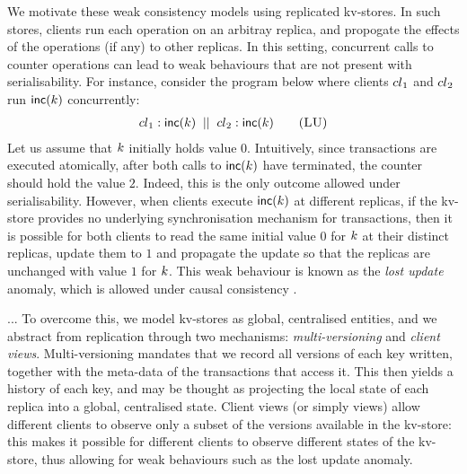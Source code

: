 We motivate these weak consistency models using replicated kv-stores. In
such stores, clients run each operation on an arbitray replica, and
propogate the effects of the operations (if any) to other
replicas. In this setting, concurrent calls to counter
operations can lead to weak behaviours that are not present with
serialisability.
%
%
For instance, consider the program below where  clients ${cl}_1$ and 
${cl}_2$  run $\mathsf{inc}(k)$ concurrently: 
\begin{align}
	\cl_1: \ctrinc(\ke)
	\;\; || \;\;
	\cl_2: \ctrinc(\ke)
	\tag{\textsc{LU}}
	\label{prog:inc2}
\end{align}
Let us assume that  $k$ initially holds value $0$.
Intuitively, since transactions are executed atomically, after both
calls to $\mathsf{inc}(k)$ have terminated, the counter should hold 
the value $2$.
Indeed, this is the only outcome allowed under serialisability. 
However, when clients execute $\mathsf{inc}(k)$ at different replicas,
if the kv-store provides no underlying synchronisation mechanism for transactions,
 then it is possible for 
both clients to  read the same initial value $0$ for $k$ at their
distinct replicas, update them to $1$ and propagate the update so that 
 the replicas are unchanged with value  $1$ for $k$.
This weak behaviour is known as the \emph{lost update} anomaly, which
is  allowed under causal consistency \cite{cops,wren,redblue}.


...
To overcome this, we model kv-stores as global, centralised entities, and 
we abstract from replication through two mechanisms: \emph{multi-versioning} and \emph{client views}. 
Multi-versioning mandates that we record all versions of each key written, 
together with the meta-data of the transactions that access it. 
This then yields a history of each key, and may be thought as projecting the local state of each replica into a global, centralised state. 
Client views (or simply views) allow different clients to observe only a subset of the versions available in 
the kv-store: this makes it possible for different clients to observe different states 
of the kv-store, thus allowing for weak behaviours such as the lost update anomaly. 

